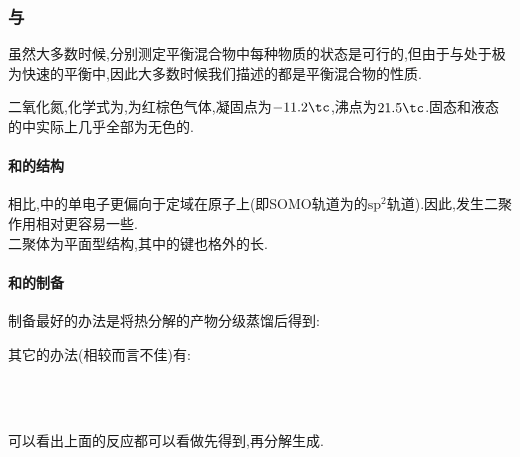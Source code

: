 \documentclass{ctexart}
\begin{document}
\subsubsection{与}
虽然大多数时候,分别测定平衡混合物中每种物质的状态是可行的,但由于与处于极为快速的平衡中,因此大多数时候我们描述的都是平衡混合物的性质.
\begin{substance}[\ce{NO2}]
    二氧化氮,化学式为,为红棕色气体,凝固点为$-11.2\tc$,沸点为$21.5\tc$.固态和液态的中实际上几乎全部为无色的.
\end{substance}
\paragraph{和的结构}
相比,中的单电子更偏向于定域在原子上(即SOMO轨道为的$\text{sp}^2$轨道).因此,发生二聚作用相对更容易一些.\\
\indent 二聚体为平面型结构,其中的键也格外的长.
\paragraph{和的制备}
制备最好的办法是将热分解的产物分级蒸馏后得到:
\begin{center}
\end{center}
其它的办法(相较而言不佳)有:
\begin{center}
    \\
    \\
\end{center}
可以看出上面的反应都可以看做先得到,再分解生成.
\end{document}
